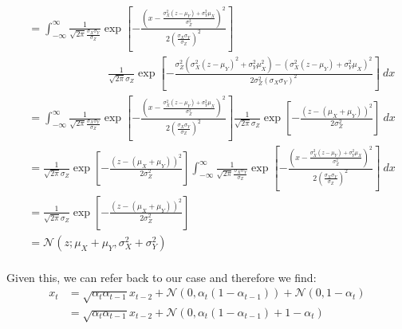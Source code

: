 \documentclass{article}
\begin{document}
{\begin{align*}
  &= \int_{-\infty}^{\infty} \frac{1}{\sqrt{2 \pi} \frac{\sigma_X \sigma_Y}{\sigma_Z}} \exp\left[{-\frac{\left( x - \frac{\sigma_X^2 (z - \mu_Y) + \sigma_Y^2 \mu_X}{\sigma_Z^2}\right)^2}{2 \left(\frac{\sigma_X \sigma_Y}{\sigma_Z}\right)^2}} \right] \\[10pt]
  & \hspace{3cm} \frac{1}{\sqrt{2 \pi} \sigma_Z} \exp \left[ - \frac{\sigma_Z^2 \left( \sigma_X^2 (z - \mu_Y)^2 + \sigma_Y^2 \mu_X^2 \right) - \left( \sigma_X^2 (z - \mu_Y) + \sigma_Y^2 \mu_X \right)^2}{2 \sigma_Z^2 (\sigma_X \sigma_Y)^2} \right] \: dx  \\[10pt]
  &= \int_{-\infty}^{\infty} \frac{1}{\sqrt{2 \pi} \frac{\sigma_X \sigma_Y}{\sigma_Z}} \exp\left[{-\frac{\left( x - \frac{\sigma_X^2 (z - \mu_Y) + \sigma_Y^2 \mu_X}{\sigma_Z^2}\right)^2}{2 \left(\frac{\sigma_X \sigma_Y}{\sigma_Z}\right)^2}} \right] \frac{1}{\sqrt{2 \pi} \sigma_Z} \exp \left[ - \frac{(z - (\mu_X + \mu_Y))^2}{2 \sigma_Z^2} \right] \: dx  \\[10pt]
  &= \frac{1}{\sqrt{2 \pi} \sigma_Z} \exp \left[ - \frac{(z - (\mu_X + \mu_Y))^2}{2 \sigma_Z^2} \right] \int_{-\infty}^{\infty} \frac{1}{\sqrt{2 \pi} \frac{\sigma_X \sigma_Y}{\sigma_Z}} \exp\left[{-\frac{\left( x - \frac{\sigma_X^2 (z - \mu_Y) + \sigma_Y^2 \mu_X}{\sigma_Z^2}\right)^2}{2 \left(\frac{\sigma_X \sigma_Y}{\sigma_Z}\right)^2}} \right] \: dx  \\[10pt]
  &= \frac{1}{\sqrt{2 \pi} \sigma_Z} \exp \left[ - \frac{(z - (\mu_X + \mu_Y))^2}{2 \sigma_Z^2} \right] \\[10pt]
  &= \mathcal{N}\left(z; \mu_X + \mu_Y, \sigma_X^2 + \sigma_Y^2 \right)
\end{align*}
}
\\
Given this, we can refer back to our case and therefore we find:
\begin{align*}
  x_t &= \sqrt{\alpha_t \alpha_{t-1}} x_{t-2} + \mathcal{N}\left(0, \alpha_t\left(1 - \alpha_{t-1}\right)\right) + \mathcal{N}\left(0, 1 - \alpha_t\right) \\
  &= \sqrt{\alpha_t \alpha_{t-1}} x_{t-2} + \mathcal{N}\left(0, \alpha_t\left(1 - \alpha_{t-1}\right) + 1 - \alpha_t\right) 
\end{align*}

\newpage
\printbibliography
\end{document}
